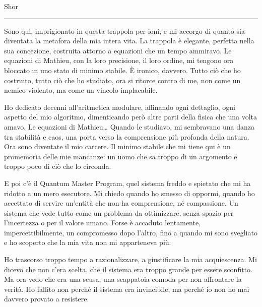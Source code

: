 \vspace{1em}
\begin{center}Shor\end{center}
\hrule
\vspace{1em}

Sono qui, imprigionato in questa trappola per ioni, e mi accorgo di quanto sia diventata la metafora della mia intera vita. La trappola è elegante, perfetta nella sua concezione, costruita attorno a equazioni che un tempo ammiravo. Le equazioni di Mathieu, con la loro precisione, il loro ordine, mi tengono ora bloccato in uno stato di minimo stabile. È ironico, davvero. Tutto ciò che ho costruito, tutto ciò che ho studiato, ora si ritorce contro di me, non come un nemico violento, ma come un vincolo implacabile.

Ho dedicato decenni all’aritmetica modulare, affinando ogni dettaglio, ogni aspetto del mio algoritmo, dimenticando però altre parti della fisica che una volta amavo. Le equazioni di Mathieu… Quando le studiavo, mi sembravano una danza tra stabilità e caos, una porta verso la comprensione più profonda della natura. Ora sono diventate il mio carcere. Il minimo stabile che mi tiene qui è un promemoria delle mie mancanze: un uomo che sa troppo di un argomento e troppo poco di ciò che lo circonda.

E poi c’è il Quantum Master Program, quel sistema freddo e spietato che mi ha ridotto a un mero esecutore. Mi chiedo quando ho smesso di oppormi, quando ho accettato di servire un’entità che non ha comprensione, né compassione. Un sistema che vede tutto come un problema da ottimizzare, senza spazio per l’incertezza o per il valore umano. Forse è accaduto lentamente, impercettibilmente, un compromesso dopo l’altro, fino a quando mi sono svegliato e ho scoperto che la mia vita non mi apparteneva più.


Ho trascorso troppo tempo a razionalizzare, a giustificare la mia acquiescenza. Mi dicevo che non c’era scelta, che il sistema era troppo grande per essere sconfitto. Ma ora vedo che era una scusa, una scappatoia comoda per non affrontare la verità. Ho fallito non perché il sistema era invincibile, ma perché io non ho mai davvero provato a resistere.

